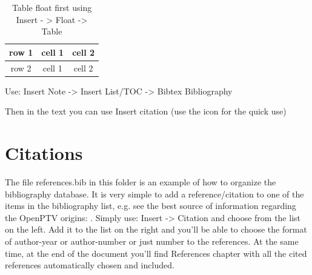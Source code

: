 \begin{table}
\begin{tabular}{|c|c|c|}
\hline 
row 1 & cell 1 & cell 2\tabularnewline
\hline 
\hline 
row 2 & cell 1 & cell 2\tabularnewline
\hline 
\end{tabular}

\caption{Table float first using Insert - > Float -> Table}


\end{table}


Use: Insert Note -> Insert List/TOC -> Bibtex Bibliography






Then in the text you can use Insert citation (use the icon for the
quick use)



\section{Citations}

The file references.bib in this folder is an example of how to organize
the bibliography database. It is very simple to add a reference/citation
to one of the items in the bibliography list, e.g. see the best source
of information regarding the OpenPTV origins: \citet{Dracos1996}.
Simply use: Insert -> Citation and choose from the list on the left.
Add it to the list on the right and you'll be able to choose the format
of author-year or author-number or just number to the references.
At the same time, at the end of the document you'll find References
chapter with all the cited references automatically chosen and included. 

